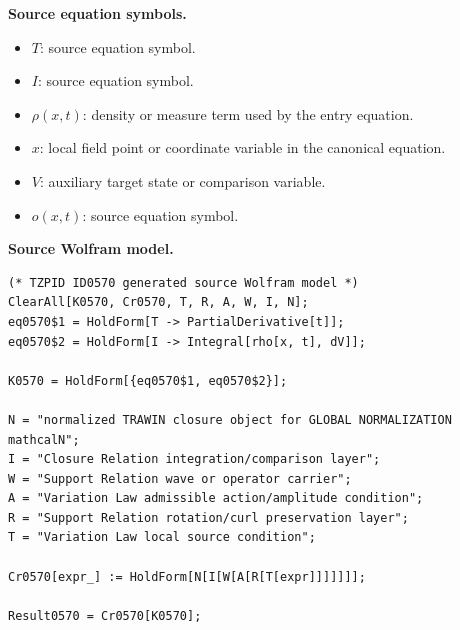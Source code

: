 \begin{minipage}[t]{0.49\linewidth}
\begingroup
\small
\raggedright
\textbf{Source equation symbols.}\par
\begin{itemize}[leftmargin=1.35em,itemsep=1pt,topsep=1pt,parsep=0pt]
    \item $T$: source equation symbol.
    \item $I$: source equation symbol.
    \item $\rho(x,t)$: density or measure term used by the entry equation.
    \item $x$: local field point or coordinate variable in the canonical equation.
    \item $V$: auxiliary target state or comparison variable.
    \item $o(x,t)$: source equation symbol.
\end{itemize}
\endgroup
\end{minipage}\hfill
\begin{minipage}[t]{0.47\linewidth}
\begingroup
\scriptsize
\raggedright
\textbf{Source Wolfram model.}\par
\begin{Verbatim}[fontsize=\tiny,breaklines=true,breakanywhere=true]
(* TZPID ID0570 generated source Wolfram model *)
ClearAll[K0570, Cr0570, T, R, A, W, I, N];
eq0570$1 = HoldForm[T -> PartialDerivative[t]];
eq0570$2 = HoldForm[I -> Integral[rho[x, t], dV]];

K0570 = HoldForm[{eq0570$1, eq0570$2}];

N = "normalized TRAWIN closure object for GLOBAL NORMALIZATION mathcalN";
I = "Closure Relation integration/comparison layer";
W = "Support Relation wave or operator carrier";
A = "Variation Law admissible action/amplitude condition";
R = "Support Relation rotation/curl preservation layer";
T = "Variation Law local source condition";

Cr0570[expr_] := HoldForm[N[I[W[A[R[T[expr]]]]]]];

Result0570 = Cr0570[K0570];
\end{Verbatim}
\endgroup
\end{minipage}

